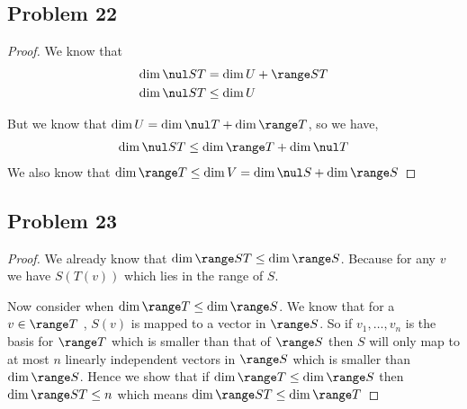 \documentclass[a4paper]{report}
\begin{document}
\subsection*{Problem 22}
\begin{proof}
    We know that 
    \begin{align*}
        \dim \nul ST &= \dim U  + \range ST\\
        \dim \nul ST &\le \dim U
    \end{align*}

    But we know that $\dim U = \dim \nul T + \dim \range T$, so we have,
     \begin{align*}
        \dim \nul ST \le \dim \range T + \dim \nul T
    \end{align*}
    We also know that $\dim \range T \le \dim V = \dim \nul S + \dim \range S$
\end{proof}


\subsection*{Problem 23}
\begin{proof}
    We already know that $\dim \range ST \le \dim \range S$. Because for any  $v$ we have $S(T(v))$ which lies in the range of $S$.

    Now consider when $\dim \range T \le \dim \range S$.  We know that for a $v \in \range T$ ,  $S(v)$ is mapped to a vector in $\range S$. So if $v_1,\dots,v_n$ is the basis for $\range T$ which is smaller than that of $\range S$ then $S$ will only map to at most $n$ linearly independent vectors in $\range S$ which is smaller than $\dim \range S$. Hence we show that if  $\dim \range T \le \dim \range S $ then $\dim \range ST \le n$ which means $\dim \range ST \le \dim \range T$
\end{proof}
\end{document}
